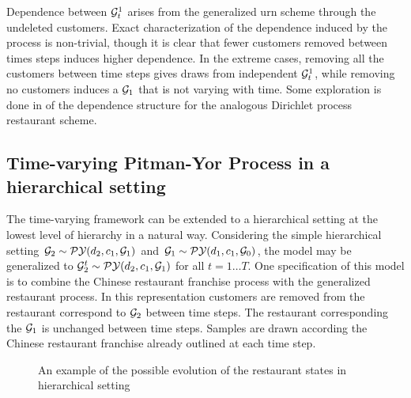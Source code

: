 Dependence between $\G_t^1$ arises from the generalized urn scheme through the undeleted customers.  Exact characterization of the dependence induced by the process is non-trivial, though it is clear that fewer customers removed between times steps induces higher dependence.  In the extreme cases, removing all the customers between time steps gives draws from independent $\G_t^1$, while removing no customers induces a $\G_1$ that is not varying with time. Some exploration is done in \cite{caron} of the dependence structure for the analogous Dirichlet process restaurant scheme.

\subsection{Time-varying Pitman-Yor Process in a hierarchical setting}

The time-varying framework can be extended to a hierarchical setting at the lowest level of hierarchy in a natural way.  Considering the simple hierarchical setting $\G_2 \sim \PY(d_2, c_1, \G_1)$ and $\G_1 \sim \PY(d_1, c_1, \G_0)$, the model may be generalized to $\G^t_2 \sim  \PY(d_2, c_1, \G_1)$ for all $t  = 1 \dots T$.  One specification of this model is to combine the Chinese restaurant franchise process with the generalized restaurant process.  In this representation customers are removed from the restaurant correspond to $\G_2$ between time steps.  The restaurant corresponding the $\G_1$ is unchanged between time steps. Samples are drawn according the Chinese restaurant franchise already outlined at each time step.

\begin{figure}[h!tbp] 
	\begin{center}
		\caption{An example of the possible evolution of the restaurant states in hierarchical setting}
	\end{center} 
	\label{figVHPY}
\end{figure} 

